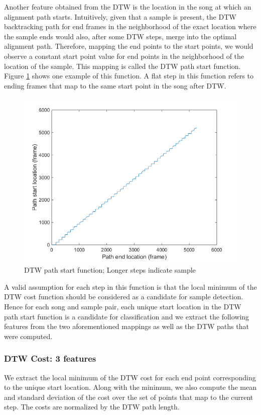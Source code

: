 \documentclass{article}
\begin{document}
Another feature obtained from the DTW is the location in the song at which an alignment path starts. Intuitively, given that a sample is present, the DTW backtracking path for end frames in the neighborhood of the exact location where the sample ends would also, after some DTW steps, merge into the optimal alignment path. Therefore, mapping the end points to the start points, we would observe a constant start point value for end points in the neighborhood of the location of the sample. This mapping is called the DTW path start function. Figure \ref{fig4} shows one example of this function. A flat step in this function refers to ending frames that map to the same start point in the song after DTW.

\begin{figure}[!ht]
\centering
\includegraphics[width=\linewidth]{DTWpath.png}
\caption{DTW path start function; Longer steps indicate sample}
\label{fig4}
\end{figure}

A valid assumption for each step in this function is that the local minimum of the DTW cost function should be considered as a candidate for sample detection. Hence for each song and sample pair, each unique start location in the DTW path start function is a candidate for classification and we extract the following features from the two aforementioned mappings as well as the DTW paths that were computed.

\subsubsection{DTW Cost: 3 features}
We extract the local minimum of the DTW cost for each end point corresponding to the unique start location. Along with the minimum, we also compute the mean and standard deviation of the cost over the set of points that map to the current step. The costs are normalized by the DTW path length.
\end{document}
